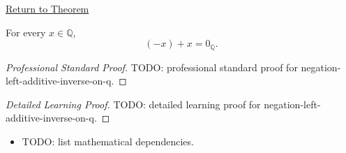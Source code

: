 \newpage
{}
\label{prf:negation-left-additive-inverse-on-q}

\begin{remark*}[Return]
\hyperref[thm:negation-left-additive-inverse-on-q]{Return to Theorem}
\end{remark*}

\begin{theorem*}
For every $x\in\mathbb{Q}$,
\[
(-x)+x=0_{\mathbb{Q}}.
\]
\end{theorem*}

\begin{proof}[Professional Standard Proof]
\LRAProofBodyStart
TODO: professional standard proof for negation-left-additive-inverse-on-q.
\end{proof}

\begin{proof}[Detailed Learning Proof]
\LRAProofBodyStart
TODO: detailed learning proof for negation-left-additive-inverse-on-q.
\end{proof}

\begin{remark*}
\end{remark*}

\begin{dependencies}
\begin{itemize}
  \item TODO: list mathematical dependencies.
\end{itemize}
\end{dependencies}

\clearpage
